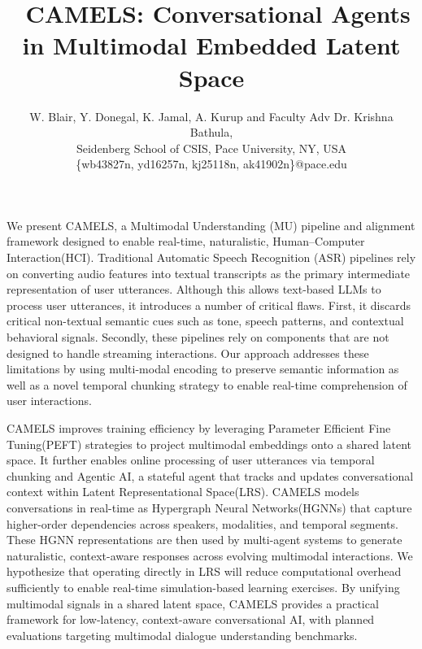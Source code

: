 \documentclass[11pt]{article} %
\begin{document}
\title{\ CAMELS: Conversational Agents in Multimodal Embedded Latent Space}


\author{W. Blair, Y. Donegal, K. Jamal, A. Kurup and Faculty Adv Dr. Krishna Bathula,
       \\Seidenberg School of CSIS, Pace University, NY, USA\\       
       \{wb43827n, yd16257n, kj25118n, ak41902n\}@pace.edu\\ 
 }

\date{}

\maketitle

We present CAMELS, a Multimodal Understanding (MU) pipeline and alignment framework designed to enable real-time, naturalistic, Human–Computer Interaction(HCI). Traditional Automatic Speech Recognition (ASR) pipelines rely on converting audio features into textual transcripts as the primary intermediate representation of user utterances. Although this allows text-based LLMs to process user utterances, it introduces a number of critical flaws. First, it discards critical non-textual semantic cues such as tone, speech patterns, and contextual behavioral signals. Secondly, these pipelines rely on components that are not designed to handle streaming interactions. Our approach addresses these limitations by using multi-modal encoding to preserve semantic information as well as a novel temporal chunking strategy to enable real-time comprehension of user interactions.

CAMELS improves training efficiency by leveraging Parameter Efficient Fine Tuning(PEFT) strategies to project multimodal embeddings onto a shared latent space. It further enables online processing of user utterances via temporal chunking and Agentic AI, a stateful agent that tracks and updates conversational context within Latent Representational Space(LRS). CAMELS models conversations in real-time as Hypergraph Neural Networks(HGNNs) that capture higher-order dependencies across speakers, modalities, and temporal segments. These HGNN representations are then used by multi-agent systems to generate naturalistic, context-aware responses across evolving multimodal interactions. We hypothesize that operating directly in LRS will reduce computational overhead sufficiently to enable real-time simulation-based learning exercises. By unifying multimodal signals in a shared latent space, CAMELS provides a practical framework for low-latency, context-aware conversational AI, with planned evaluations targeting multimodal dialogue understanding benchmarks.
\end{document}
